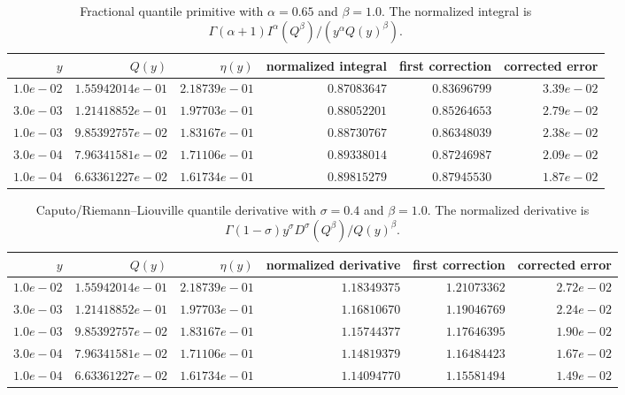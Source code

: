 \begin{table}[htbp]
\centering\small
\begin{tabular}{@{}rrrrrr@{}}
\toprule
$y$ & $Q(y)$ & $\eta(y)$ & normalized integral & first correction & corrected error\\
\midrule
$1.0e-02$ & $1.55942014e-01$ & $2.18739e-01$ & $0.87083647$ & $0.83696799$ & $3.39e-02$\\
$3.0e-03$ & $1.21418852e-01$ & $1.97703e-01$ & $0.88052201$ & $0.85264653$ & $2.79e-02$\\
$1.0e-03$ & $9.85392757e-02$ & $1.83167e-01$ & $0.88730767$ & $0.86348039$ & $2.38e-02$\\
$3.0e-04$ & $7.96341581e-02$ & $1.71106e-01$ & $0.89338014$ & $0.87246987$ & $2.09e-02$\\
$1.0e-04$ & $6.63361227e-02$ & $1.61734e-01$ & $0.89815279$ & $0.87945530$ & $1.87e-02$\\
\bottomrule\end{tabular}
\caption{Fractional quantile primitive with $\alpha=0.65$ and $\beta=1.0$. The normalized integral is $\Gamma(\alpha+1)I^\alpha(Q^\beta)/(y^\alpha Q(y)^\beta)$.}
\label{p10:tab:quantile-frac-int}
\end{table}
\begin{table}[htbp]
\centering\small
\begin{tabular}{@{}rrrrrr@{}}
\toprule
$y$ & $Q(y)$ & $\eta(y)$ & normalized derivative & first correction & corrected error\\
\midrule
$1.0e-02$ & $1.55942014e-01$ & $2.18739e-01$ & $1.18349375$ & $1.21073362$ & $2.72e-02$\\
$3.0e-03$ & $1.21418852e-01$ & $1.97703e-01$ & $1.16810670$ & $1.19046769$ & $2.24e-02$\\
$1.0e-03$ & $9.85392757e-02$ & $1.83167e-01$ & $1.15744377$ & $1.17646395$ & $1.90e-02$\\
$3.0e-04$ & $7.96341581e-02$ & $1.71106e-01$ & $1.14819379$ & $1.16484423$ & $1.67e-02$\\
$1.0e-04$ & $6.63361227e-02$ & $1.61734e-01$ & $1.14094770$ & $1.15581494$ & $1.49e-02$\\
\bottomrule\end{tabular}
\caption{Caputo/Riemann--Liouville quantile derivative with $\sigma=0.4$ and $\beta=1.0$.  The normalized derivative is $\Gamma(1-\sigma)y^\sigma D^\sigma(Q^\beta)/Q(y)^\beta$.}
\label{p10:tab:quantile-frac-der}
\end{table}
